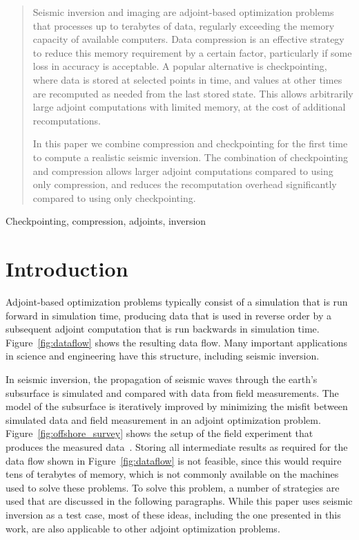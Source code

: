 \documentclass[conference]{IEEEtran}
\begin{document}
\begin{abstract}
Seismic inversion and imaging are adjoint-based optimization problems that processes up to terabytes of data, regularly exceeding the memory
capacity of available computers. Data compression is an effective strategy to
reduce this memory requirement by a certain factor, particularly if some loss in
accuracy is acceptable. A popular alternative is checkpointing, where data is
stored at selected points in time, and values at other times are recomputed as
needed from the last stored state.  This allows arbitrarily large adjoint
computations with limited memory, at the cost of additional recomputations.

In this paper we combine compression and checkpointing for the first
time to compute a realistic seismic inversion. The combination of
checkpointing and compression allows
larger adjoint computations compared to using only compression, and
reduces the recomputation overhead significantly compared to using only checkpointing.
\end{abstract}

\begin{IEEEkeywords}
Checkpointing, compression, adjoints, inversion
\end{IEEEkeywords}

\section{Introduction}
Adjoint-based optimization problems typically consist of a simulation that is
run forward in simulation time, producing data that is used in reverse order by
a subsequent adjoint computation that is run backwards in simulation time.
Figure~\ref{fig:dataflow} shows the resulting data flow. Many important
applications in science and engineering have this structure, including
seismic inversion.

In seismic inversion, the propagation of seismic waves through the earth's subsurface is simulated and compared with data from field measurements. The model of the subsurface is iteratively improved by minimizing the misfit between simulated data and field measurement in an adjoint optimization problem.
Figure~\ref{fig:offshore_survey} shows the setup of the field experiment that produces the measured data~\cite{plessix2006review}. Storing all intermediate
results as required for the data flow shown in Figure~\ref{fig:dataflow} is not
feasible, since this would require tens of terabytes of memory, which is not
commonly available on the machines used to solve these problems. To solve this
problem, a number of strategies are used that are discussed in the following
paragraphs. While this paper uses seismic inversion as a test case, most of these ideas, including the one presented in this work, are also applicable to other adjoint optimization problems.
\end{document}
